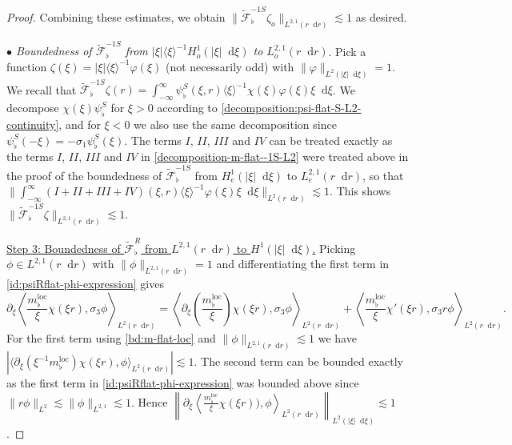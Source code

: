 \documentclass[11 pt]{amsart}
\newcommand{\tmop}[1]{\ensuremath{\operatorname{#1}}}
\theoremstyle{definition}
\theoremstyle{remark}
\numberwithin{equation}{section}
\newcommand{\dd}{\mathop{}\!\mathrm{d}}
\begin{document}
\begin{proof}
Combining these estimates, we obtain $\| \widetilde {\mathcal F}_\flat ^{-1S} \zeta_o \|_{L^{2,1}(r\dd r)}\lesssim 1$ as desired.

\smallskip

\noindent \textit{$\bullet$ Boundedness of $\widetilde{\mathcal F}^{-1S}_\flat$ from $|\xi| \langle \xi\rangle^{-1}H^1_{o}(|\xi|\dd \xi)$ to $L^{2,1}_{o}(r\dd r)$}. Pick a function $\zeta(\xi) = |\xi|\langle \xi \rangle^{-1} \varphi(\xi) $ (not necessarily odd) with $\| \varphi\|_{L^2(|\xi|\dd \xi)}= 1$. We recall that $ \widetilde {\mathcal F}_\flat ^{-1S} \zeta (r) = \int_{-\infty}^\infty \psi_\flat^S(\xi,r) \langle \xi \rangle^{-1}\chi(\xi)\varphi(\xi)\xi \dd \xi$. We decompose $\chi(\xi)\psi_\flat^S$ for $\xi>0$ according to \eqref{decomposition:psi-flat-S-L2-continuity}, and for $\xi<0$ we also use the same decomposition since $\psi^S_\flat(-\xi)=-\sigma_1\psi^S_\flat(\xi)$. The terms $I$, $II$, $III$ and $IV$ can be treated exactly as the terms $I$, $II$, $III$ and $IV$ in \eqref{decomposition-m-flat--1S-L2} were treated above in the proof of the boundedness of $\widetilde{\mathcal F}_\flat^{-1S}$ from $ H^1_{e}(|\xi|\dd \xi)$ to $L^{2,1}_{e}(r\dd r)$, so that $\| \int_{-\infty}^\infty (I+II+III+IV)(\xi,r)\langle \xi \rangle^{-1} \varphi(\xi)\xi \dd \xi   \|_{L^2(r\dd r)} \lesssim 1$. This shows $ \| \widetilde{\mathcal F}_\flat^{-1S} \zeta \|_{L^{2,1}(r \dd r)} \lesssim 1$.

\medskip


\noindent \underline{Step 3: Boundedness of $\widetilde{\mathcal F}^R_\flat$ from $L^{2,1}(r\dd r)$ to $H^1(|\xi|\dd \xi)$.} Picking $\phi \in L^{2,1}(r\dd r)$ with $\| \phi\|_{L^{2,1}(r\dd r)}=1$ and differentiating the first term in \eqref{id:psiRflat-phi-expression} gives
$$
\partial_\xi \left\langle \frac{m_{\flat}^{\tmop{loc}}}{\xi}  \chi(\xi r),\sigma_3 \phi \right\rangle_{L^2(r\dd r)}=\left\langle \partial_\xi\left(\frac{m_{\flat}^{\tmop{loc}}}{\xi} \right) \chi (\xi r),\sigma_3 \phi \right\rangle_{L^2(r\dd r)}+\left\langle \frac{m_{\flat}^{\tmop{loc}}}{\xi}  \chi'(\xi r), \sigma_3 r \phi \right\rangle_{L^2(r\dd r)}.
$$
For the first term using \eqref{bd:m-flat-loc} and $\|\phi\|_{L^{2,1}(r\dd r)}\lesssim 1$ we have $|\langle \partial_\xi(\xi^{-1} m_{\flat}^{\tmop{loc}})  \chi(\xi r), \phi \rangle_{L^2(r\dd r)}|\lesssim 1$. The second term can be bounded exactly as the first term in \eqref{id:psiRflat-phi-expression} was bounded above since $\| r \phi\|_{L^2}\lesssim\|\phi\|_{L^{2,1}}\lesssim 1$. Hence $\left\|\partial_\xi \left\langle \frac{m_{\flat}^{\tmop{loc}}}{\xi} \chi (\xi r)), \phi \right\rangle_{L^2(r\dd r)}\right\|_{L^2(|\xi|\dd \xi)}\lesssim 1$.


\end{proof}
\end{document}
